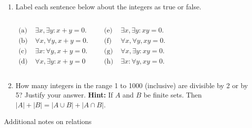 \documentclass[10pt]{beamer}
\begin{document}
\begin{frame}
 \vfill

 \begin{mygreenbox}[title=Problems Quiz (Quantifiers and Set Operations)]
\begin{enumerate}
	\item  
 Label each sentence below about the integers as true or false. 
 \vspace{-0.15cm}
	\begin{columns}
	    \begin{align*}
	       \text{(a)} &\; \exists x, \exists y: x+y=0. \\
	        \text{(b)} & \; \forall x, \forall y, x+y=0. \\ 
	      \text{(c)} & \; \exists x: \forall y, x+y=0. \\ 
	         \text{(d)} & \; \forall x, \exists y: x+y=0           
	      \end{align*}
	
	    \begin{align*} 
	       \text{(e)} &\; \exists x, \exists y: xy=0. \\
	        \text{(f)} & \; \forall x, \forall y, xy=0.  \\
	      \text{(g)} & \; \forall x, \exists y: xy=0. \\
	        \text{(h)} & \; \exists x: \forall y, xy=0. 
	    \end{align*}
	\vfill 
	\end{columns}
   \item How many integers in the range 1 to 1000 (inclusive) are divisible by 2 or by 5?  Justify your answer. \textbf{Hint:} If $A$ and $B$ be finite sets.  Then \quad $|A| + |B| = |A \cup B| + |A \cap B|$.
\end{enumerate}
\end{mygreenbox}



\end{frame}


\begin{frame}[standout]
Additional notes on relations
\end{frame}
\end{document}
